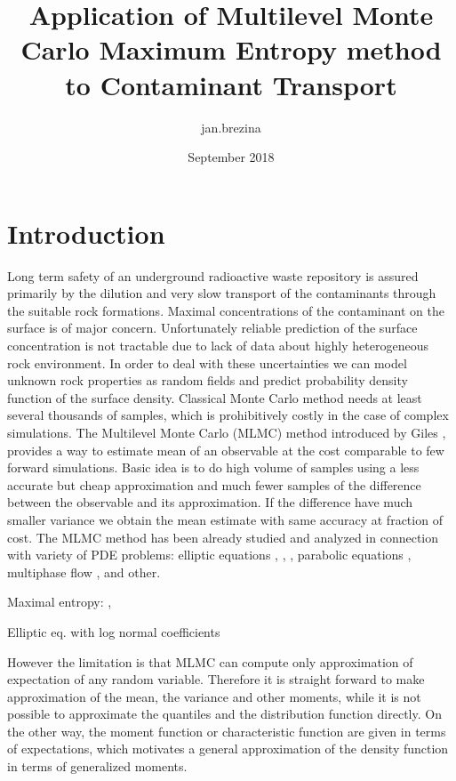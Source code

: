 \documentclass{article}
\title{Application of Multilevel Monte Carlo Maximum Entropy method to Contaminant Transport}
\author{jan.brezina }
\date{September 2018}
\begin{document}
\maketitle

\section{Introduction}
Long term safety of an underground radioactive waste repository is assured primarily by the dilution and 
very slow transport of the contaminants through the suitable rock formations. Maximal concentrations of the contaminant on the surface is of major concern. Unfortunately reliable prediction of the surface concentration is not tractable due to lack of data about highly heterogeneous rock environment. In order to deal with these uncertainties we can model unknown rock properties as random fields and predict probability density function of the surface density. 
Classical Monte Carlo method needs at least several thousands of samples, which is prohibitively costly in the case of complex simulations. The Multilevel Monte Carlo (MLMC) method introduced by Giles \cite{Giles2008}, \cite{Giles2015} provides a way to estimate mean of an observable at the cost comparable to few forward simulations. Basic idea is to do high volume of samples using a less accurate but cheap approximation and much fewer samples of the difference between the observable and its approximation. If the difference have much smaller variance we obtain the mean estimate with same accuracy at fraction of cost.  The MLMC method has been already studied and analyzed in connection with variety of PDE problems: elliptic equations \cite{Barth2011a}, \cite{Cliffe2011a}, \cite{Abdulle2013}, parabolic equations \cite{Barth2013},
multiphase flow \cite{Muller2013}, \cite{Lu2016} and other.


Maximal entropy:
\cite{Barron1991}, \cite{Bierig2016a}

Elliptic eq. with log normal coefficients \cite{Graham2015}






 However the limitation is that MLMC can compute only approximation of expectation of any random variable. Therefore it is straight forward to make approximation of the mean, the variance and other moments, while it is not possible to approximate the quantiles and the distribution function directly. On the other way, the moment function or characteristic function are given in terms of expectations, which motivates a general approximation of the density function in terms of generalized moments.
\end{document}
